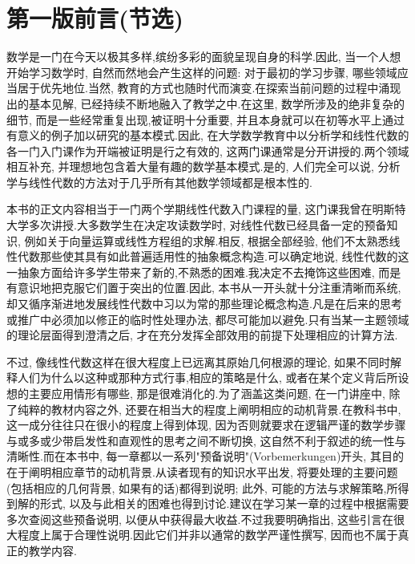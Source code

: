 ﻿%

\chapter*{第一版前言(节选)}

数学是一门在今天以极其多样,缤纷多彩的面貌呈现自身的科学.因此, 当一个人想开始学习数学时, 自然而然地会产生这样的问题: 对于最初的学习步骤, 哪些领域应当居于优先地位.当然, 教育的方式也随时代而演变.在探索当前问题的过程中涌现出的基本见解, 已经持续不断地融入了教学之中.在这里, 数学所涉及的绝非复杂的细节, 而是一些经常重复出现,被证明十分重要, 并且本身就可以在初等水平上通过有意义的例子加以研究的基本模式.因此, 在大学数学教育中以分析学和线性代数的各一门入门课作为开端被证明是行之有效的, 这两门课通常是分开讲授的.两个领域相互补充, 并理想地包含着大量有趣的数学基本模式.是的, 人们完全可以说, 分析学与线性代数的方法对于几乎所有其他数学领域都是根本性的.

本书的正文内容相当于一门两个学期线性代数入门课程的量, 这门课我曾在明斯特大学多次讲授.大多数学生在决定攻读数学时, 对线性代数已经具备一定的预备知识, 例如关于向量运算或线性方程组的求解.相反, 根据全部经验, 他们不太熟悉线性代数那些使其具有如此普遍适用性的抽象概念构造.可以确定地说, 线性代数的这一抽象方面给许多学生带来了新的,不熟悉的困难.我决定不去掩饰这些困难, 而是有意识地把克服它们置于突出的位置.因此, 本书从一开头就十分注重清晰而系统,却又循序渐进地发展线性代数中习以为常的那些理论概念构造.凡是在后来的思考或推广中必须加以修正的临时性处理办法, 都尽可能加以避免.只有当某一主题领域的理论层面得到澄清之后, 才在充分发挥全部效用的前提下处理相应的计算方法.

不过, 像线性代数这样在很大程度上已远离其原始几何根源的理论, 如果不同时解释人们为什么以这种或那种方式行事,相应的策略是什么, 或者在某个定义背后所设想的主要应用情形有哪些, 那是很难消化的.为了涵盖这类问题, 在一门讲座中, 除了纯粹的教材内容之外, 还要在相当大的程度上阐明相应的动机背景.在教科书中, 这一成分往往只在很小的程度上得到体现, 因为否则就要求在逻辑严谨的数学步骤与或多或少带启发性和直观性的思考之间不断切换, 这自然不利于叙述的统一性与清晰性.而在本书中, 每一章都以一系列"预备说明"(Vorbemerkungen)开头, 其目的在于阐明相应章节的动机背景.从读者现有的知识水平出发, 将要处理的主要问题(包括相应的几何背景, 如果有的话)都得到说明; 此外, 可能的方法与求解策略,所得到解的形式, 以及与此相关的困难也得到讨论.建议在学习某一章的过程中根据需要多次查阅这些预备说明, 以便从中获得最大收益.不过我要明确指出, 这些引言在很大程度上属于合理性说明.因此它们并非以通常的数学严谨性撰写, 因而也不属于真正的教学内容.

